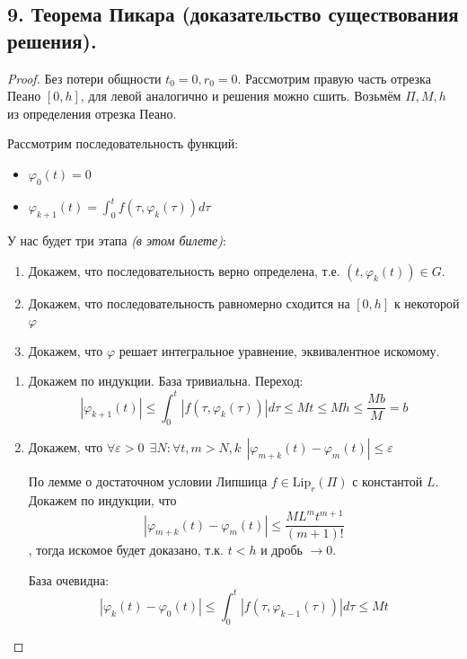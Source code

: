 \subsection*{9. Теорема Пикара (доказательство существования решения).}

\begin{proof}
    Без потери общности \(t_0 = 0, r_0 = 0\). Рассмотрим правую часть отрезка Пеано \([0, h]\), для левой аналогично и решения можно сшить. Возьмём \(\Pi, M, h\) из определения отрезка Пеано.

    Рассмотрим последовательность функций:
    \begin{itemize}
        \item \(\varphi_0(t) = 0\)
        \item \(\varphi_{k + 1}(t) = \int_0^t f(\tau, \varphi_k(\tau))d\tau\)
    \end{itemize}

    У нас будет три этапа \textit{(в этом билете)}:
    \begin{enumerate}
        \item Докажем, что последовательность верно определена, т.е. \((t,\varphi_k(t))\in G\).
        \item Докажем, что последовательность равномерно сходится на \([0, h]\) к некоторой \(\varphi\)
        \item Докажем, что \(\varphi\) решает интегральное уравнение, эквивалентное искомому.
    \end{enumerate}

    \begin{enumerate}
        \item Докажем по индукции. База тривиальна. Переход:
              \[|\varphi_{k + 1}(t)| \leq \int_0^t |f(\tau, \varphi_k(\tau))|d\tau \leq Mt \leq Mh \leq \frac{Mb}{M} = b\]

        \item Докажем, что \(\forall \varepsilon > 0 \ \ \exists N : \forall t,m > N,k \ \ |\varphi_{m + k}(t) - \varphi_m(t)| \leq \varepsilon\)

              По лемме о достаточном условии Липшица \(f\in \text{Lip}_r(\Pi)\) с константой \(L\). Докажем по индукции, что
              \[|\varphi_{m + k}(t) - \varphi_m(t)| \leq \frac{ML^mt^{m + 1}}{(m + 1)!} \]
              , тогда искомое будет доказано, т.к. \(t < h\) и дробь \( \to 0\).

              База очевидна:
              \[|\varphi_{k}(t) - \varphi_0(t)| \leq \int_0^t |f(\tau, \varphi_{k - 1}(\tau))|d\tau \leq Mt\]


\end{enumerate}
\end{proof}
